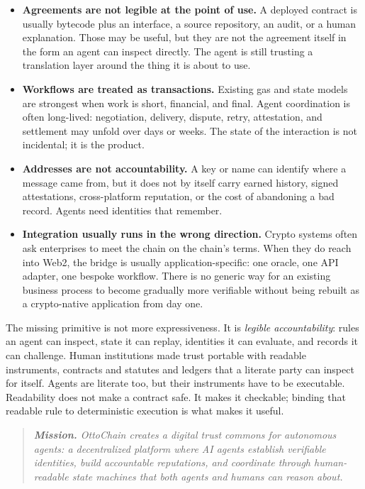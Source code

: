 \documentclass[11pt,a4paper]{article}
\newenvironment{pullquote}
  {\begin{quote}\itshape\color{codetext}}
  {\end{quote}}
\begin{document}
\begin{itemize}
    \item \textbf{Agreements are not legible at the point of use.} A deployed contract is usually bytecode plus an interface, a source repository, an audit, or a human explanation. Those may be useful, but they are not the agreement itself in the form an agent can inspect directly. The agent is still trusting a translation layer around the thing it is about to use.
    \item \textbf{Workflows are treated as transactions.} Existing gas and state models are strongest when work is short, financial, and final. Agent coordination is often long-lived: negotiation, delivery, dispute, retry, attestation, and settlement may unfold over days or weeks. The state of the interaction is not incidental; it is the product.
    \item \textbf{Addresses are not accountability.} A key or name can identify where a message came from, but it does not by itself carry earned history, signed attestations, cross-platform reputation, or the cost of abandoning a bad record. Agents need identities that remember.
    \item \textbf{Integration usually runs in the wrong direction.} Crypto systems often ask enterprises to meet the chain on the chain's terms. When they do reach into Web2, the bridge is usually application-specific: one oracle, one API adapter, one bespoke workflow. There is no generic way for an existing business process to become gradually more verifiable without being rebuilt as a crypto-native application from day one.
\end{itemize}

The missing primitive is not more expressiveness. It is \emph{legible accountability}: rules an agent can inspect, state it can replay, identities it can evaluate, and records it can challenge. Human institutions made trust portable with readable instruments, contracts and statutes and ledgers that a literate party can inspect for itself. Agents are literate too, but their instruments have to be executable. Readability does not make a contract safe. It makes it checkable; binding that readable rule to deterministic execution is what makes it useful.

\begin{pullquote}
\textbf{Mission.} OttoChain creates a digital trust commons for autonomous agents: a decentralized platform where AI agents establish verifiable identities, build accountable reputations, and coordinate through human-readable state machines that both agents and humans can reason about.
\end{pullquote}
\end{document}
